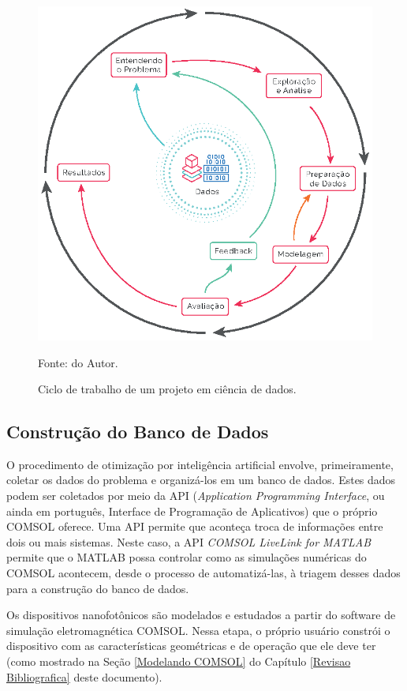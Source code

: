 \begin{figure}[H]
    \centering
    \includegraphics{04-Figuras/DataScienceDutyCicle.eps}
    \caption{Ciclo de trabalho de um projeto em ciência de dados.} \par
    Fonte: do Autor.
    \label{figura: DataScienceDutyCicle}
\end{figure}


\subsection{Construção do Banco de Dados}

O procedimento de otimização por inteligência artificial envolve, primeiramente, coletar os dados do problema e organizá-los em um banco de dados. Estes dados podem ser coletados por meio da API (\textit{Application Programming Interface}, ou ainda em português, Interface de Programação de Aplicativos) que o próprio COMSOL oferece. Uma API permite que aconteça troca de informações entre dois ou mais sistemas. Neste caso, a API \textit{COMSOL LiveLink for MATLAB} permite que o MATLAB possa controlar como as simulações numéricas do COMSOL acontecem, desde o processo de automatizá-las, à triagem desses dados para a construção do banco de dados.

Os dispositivos nanofotônicos são modelados e estudados a partir do software de simulação eletromagnética COMSOL. Nessa etapa, o próprio usuário constrói o dispositivo com as características geométricas e de operação que ele deve ter (como mostrado na Seção \ref{Modelando COMSOL} do Capítulo \ref{Revisao Bibliografica} deste documento).

